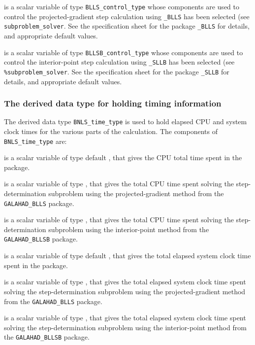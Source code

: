 \documentclass{galahad}
\newcommand{\packagename}{BNLS}
\begin{document}
\begin{description}
 is a scalar variable of type
{\tt BLLS\_control\_type}
whose components are used to control
the projected-gradient step calculation using
{\tt \libraryname\_BLLS} has been selected (see {\tt subproblem\_solver}.
See the specification sheet for the package
{\tt \libraryname\_BLLS}
for details, and appropriate default values.

 is a scalar variable of type
{\tt BLLSB\_control\_type}
whose components are used to control
the interior-point step calculation using
{\tt \libraryname\_SLLB} has been selected (see {\tt \%subproblem\_solver}.
See the specification sheet for the package
{\tt \libraryname\_SLLB}
for details, and appropriate default values.

\end{description}


\subsubsection{The derived data type for holding timing
 information}\label{typetime}
The derived data type
{\tt \packagename\_time\_type}
is used to hold elapsed CPU and system clock times for the various parts
of the calculation. The components of
{\tt \packagename\_time\_type}
are:
\begin{description}
 is a scalar variable of type default \realdp, that gives
 the CPU total time spent in the package.

 is a scalar variable of type \realdp, that gives
the total CPU time spent solving the step-determination subproblem
using the projected-gradient method from the {\tt GALAHAD\_BLLS} package.

 is a scalar variable of type \realdp, that gives
the total CPU time spent solving the step-determination subproblem
using the interior-point method from the {\tt GALAHAD\_BLLSB} package.

 is a scalar variable of type default \realdp, that gives
 the total elapsed system clock time spent in the package.

 is a scalar variable of type \realdp, that gives the total 
elapsed system clock time spent solving the step-determination subproblem
using the projected-gradient method from the {\tt GALAHAD\_BLLS} package.

 is a scalar variable of type \realdp, that gives the total 
elapsed system clock time spent solving the step-determination subproblem
using the interior-point method from the {\tt GALAHAD\_BLLSB} package.

\end{description}
\end{document}
